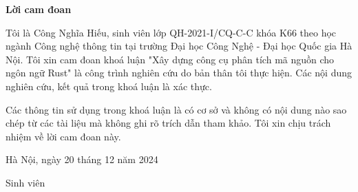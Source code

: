 \setcounter{page}{1}
\begin{center}
\textbf{\large{Lời cam đoan}	}
\end{center}

Tôi là Công Nghĩa Hiếu, sinh viên lớp QH-2021-I/CQ-C-C khóa K66 theo học ngành Công nghệ thông tin tại trường Đại học Công Nghệ - Đại học Quốc gia Hà Nội.
Tôi xin cam đoan khoá luận "Xây dựng công cụ phân tích mã nguồn cho ngôn ngữ Rust" là công trình nghiên cứu do bản thân tôi thực hiện.
Các nội dung nghiên cứu, kết quả trong khoá luận là xác thực.

Các thông tin sử dụng trong khoá luận là có cơ sở và không có nội dung nào sao chép từ các tài liệu mà không ghi rõ trích dẫn tham khảo.
Tôi xin chịu trách nhiệm về lời cam đoan này.

\begin{flushright}
Hà Nội, ngày 20 tháng 12 năm 2024
\end{flushright}

\begin{changemargin}{11.5cm}{2cm}
Sinh viên
\\[2cm]
\end{changemargin}

